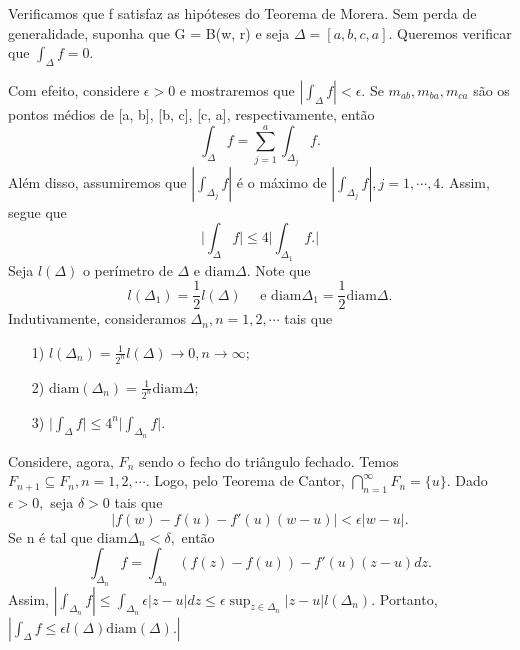 \documentclass[ComplexAnalysis/complex.tex]{subfiles}
\begin{document}
\begin{proof*}
	Verificamos que f satisfaz as hipóteses do Teorema de Morera.
	Sem perda de generalidade, suponha que G = B(w, r) e seja $\Delta=[a, b, c, a].$
	Queremos verificar que $\int_{\Delta}^{}f = 0.$

	Com efeito, considere $\epsilon > 0$ e mostraremos que $|\int_{\Delta}^{}f| < \epsilon.$ Se
	$m_{ab}, m_{ba}, m_{ca}$ são os pontos médios de [a, b], [b, c], [c, a], respectivamente,
	então
	$$
		\int_{\Delta}^{}f = \sum\limits_{j=1}^{a}\int_{\Delta_{j}}^{}f.
	$$
	Além disso, assumiremos que $|\int_{\Delta_j}^{}f|$ é o máximo de
	$|\int_{\Delta_{j}}^{}f|, j = 1, \cdots, 4$. Assim, segue que
	$$
		\biggl|\int_{\Delta}^{}f\biggr|\leq4 \biggl|\int_{\Delta_{1}}^{}f.\biggr|
	$$
	Seja $l(\Delta)$ o perímetro de $\Delta$ e $\mathrm{diam} \Delta$. Note que
	$$
		l(\Delta_{1}) = \frac{1}{2}l(\Delta)\quad\text{ e } \mathrm{diam} \Delta_{1} = \frac{1}{2}\mathrm{diam }\Delta.
	$$
	Indutivamente, consideramos $\Delta_{n}, n = 1, 2, \cdots$ tais que
	\begin{itemize}
		\item[1)] $l(\Delta_{n}) = \frac{1}{2^n}l(\Delta)\to0, n\to\infty;$
		\item[2)] $\mathrm{diam}(\Delta_{n}) = \frac{1}{2^n}\mathrm{diam} \Delta;$
		\item[3)] $\biggl|\int_{\Delta}^{}f\biggr|\leq 4^n\biggl|\int_{\Delta_{n}}^{}f\biggr|.$
	\end{itemize}
	Considere, agora, $F_{n}$ sendo o fecho do triângulo fechado. Temos
	$F_{n+1}\subseteq{F_{n}}, n=1, 2, \cdots.$ Logo, pelo Teorema de Cantor, $\bigcap_{n=1}^{\infty}F_{n}=\{u\}. $
	Dado $\epsilon > 0,$ seja $\delta > 0$ tais que
	$$
		|f(w) - f(u) - f'(u)(w-u)| < \epsilon|w-u|.
	$$
	Se n é tal que $\mathrm{diam} \Delta_{n} < \delta,$ então
	$$
		\int_{\Delta_{n}}^{}f = \int_{\Delta_{n}}^{}(f(z) - f(u)) - f'(u)(z-u)dz.
	$$
	Assim, $|\int_{\Delta_{n}}^{}f|\leq \int_{\Delta_{n}}^{}\epsilon|z-u|dz\leq \epsilon\sup_{z\in{\Delta_{n}}}|z-u|l(\Delta_{n}).$
	Portanto, $|\int_{\Delta}^{}f \leq \epsilon l(\Delta) \mathrm{diam}(\Delta).|$ \qedsymbol
\end{proof*}
\end{document}
